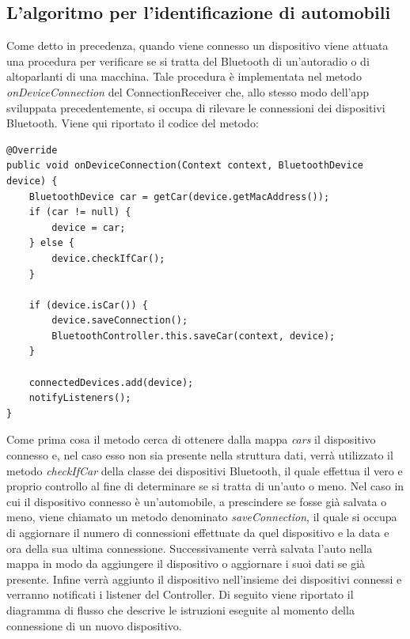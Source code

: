\subsection{L'algoritmo per l'identificazione di automobili}\label{ref:rilevamento_macchina}
Come detto in precedenza, quando viene connesso un dispositivo viene attuata una procedura per verificare se si tratta del Bluetooth di un'autoradio o di altoparlanti di una macchina. Tale procedura è implementata nel metodo \textit{onDeviceConnection} del ConnectionReceiver che, allo stesso modo dell'app sviluppata precedentemente, si occupa di rilevare le connessioni dei dispositivi Bluetooth. Viene qui riportato il codice del metodo:
\begin{verbatim}
@Override
public void onDeviceConnection(Context context, BluetoothDevice device) {
    BluetoothDevice car = getCar(device.getMacAddress());
    if (car != null) {
        device = car;
    } else {
        device.checkIfCar();
    }

    if (device.isCar()) {
        device.saveConnection();
        BluetoothController.this.saveCar(context, device);
    }

    connectedDevices.add(device);
    notifyListeners();
}
\end{verbatim}
Come prima cosa il metodo cerca di ottenere dalla mappa \textit{cars} il dispositivo connesso e, nel caso esso non sia presente nella struttura dati, verrà utilizzato il metodo \textit{checkIfCar} della classe dei dispositivi Bluetooth, il quale effettua il vero e proprio controllo al fine di determinare se si tratta di un'auto o meno. Nel caso in cui il dispositivo connesso è un'automobile, a prescindere se fosse già salvata o meno, viene chiamato un metodo denominato \textit{saveConnection}, il quale si occupa di aggiornare il numero di connessioni effettuate da quel dispositivo e la data e ora della sua ultima connessione. Successivamente verrà salvata l'auto nella mappa in modo da aggiungere il dispositivo o aggiornare i suoi dati se già presente. Infine verrà aggiunto il dispositivo nell'insieme dei dispositivi connessi e verranno notificati i listener del Controller. Di seguito viene riportato il diagramma di flusso che descrive le istruzioni eseguite al momento della connessione di un nuovo dispositivo.

